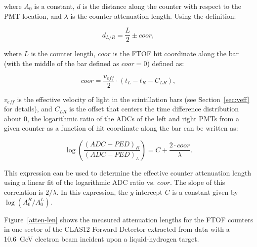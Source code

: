 \documentclass[final,3p,twocolumn]{elsarticle}
\begin{document}
\noindent
where $A_0$ is a constant, $d$ is the distance along the counter with respect to the PMT location, and
$\lambda$ is the counter attenuation length. Using the definition:

\begin{equation}
  d_{L/R} = \frac{L}{2} \pm coor,
\end{equation}

\noindent
where $L$ is the counter length, $coor$ is the FTOF hit coordinate along the bar (with the middle of the bar
defined as $coor=0$) defined as:

\begin{equation}
\label{coor}
coor = \frac{v_{eff}}{2} \cdot (t_L - t_R - C_{LR}),
\end{equation}

\noindent
$v_{eff}$ is the effective velocity of light in the scintillation bars (see Section~\ref{sec:veff} for details), and
$C_{LR}$ is the offset that centers the time difference distribution about 0, the logarithmic ratio of the ADCs
of the left and right PMTs from a given counter as a function of hit coordinate along the bar can be written as:

\begin{equation}
\label{linear}
\log \left( \frac{(ADC-PED)_R}{(ADC-PED)_L} \right ) = C + \frac{2 \cdot coor}{\lambda}.
\end{equation}

\noindent
This expression can be used to determine the effective counter attenuation length using a linear fit of the
logarithmic ADC ratio vs. $coor$. The slope of this correlation is $2/\lambda$. In this expression, the
$y$-intercept $C$ is a constant given by $\log(A_0^R/A_0^L)$.

Figure~\ref{atten-len} shows the measured attenuation lengths for the FTOF counters in one sector of
the CLAS12 Forward Detector extracted from data with a 10.6~GeV electron beam incident upon a
liquid-hydrogen target.
\end{document}
